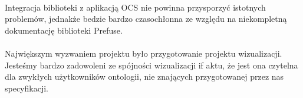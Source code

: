 \documentclass[a4paper,10pt]{article}
\begin{document}
\paragraph{} Integracja biblioteki z aplikacją OCS nie powinna przysporzyć istotnych problemów, jednakże bedzie bardzo czasochłonna ze względu na niekompletną dokumentację biblioteki Prefuse.
\paragraph{} Największym wyzwaniem projektu było przygotowanie projektu wizualizacji. Jesteśmy bardzo zadowoleni ze spójności wizualizacji if aktu, że jest ona czytelna dla zwykłych użytkowników ontologii, nie znających przygotowanej przez nas specyfikacji.
\end{document}

